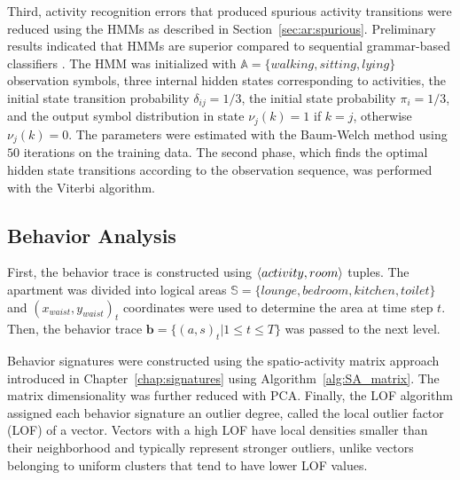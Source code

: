 Third, activity recognition errors that produced spurious activity transitions were reduced using the HMMs \citep{Rabiner1989} as described in Section~\ref{sec:ar:spurious}. Preliminary results indicated that HMMs are superior compared to sequential grammar-based classifiers \citep{Kaluza09Reducing}. The HMM was initialized with $\mathbb{A}=\{walking, sitting, lying\}$ observation symbols, three internal hidden states corresponding to activities, the initial state transition probability $\delta_{ij} = 1/3$, the initial state probability $\pi_i=1/3$, and the output symbol distribution in state $\nu_j(k) = 1$ if $k=j$, otherwise $\nu_j(k)=0$. The parameters were estimated with the Baum-Welch method using $50$ iterations on the training data. The second phase, which finds the optimal hidden state transitions according to the observation sequence, was performed with the Viterbi algorithm. 




\subsection{Behavior Analysis}
\label{sec:ba}

First, the behavior trace is constructed using $\langle activity, room \rangle$ tuples. The apartment was divided into logical areas $\mathbb{S}=\{lounge, bedroom, kitchen, toilet\}$ and $(x_{waist},y_{waist})_t$ coordinates were used to determine the area at time step $t$. Then, the behavior trace $\mathbf{b}=\{(a, s)_t|1\leq t \leq T\}$ was passed to the next level.

Behavior signatures were constructed using the spatio-activity matrix approach introduced in Chapter~\ref{chap:signatures} using Algorithm~\ref{alg:SA_matrix}. The matrix dimensionality was further reduced with PCA. Finally, the LOF algorithm \citep{Breunig00lof} assigned each behavior signature an outlier degree, called the local outlier factor (LOF) of a vector. Vectors with a high LOF have local densities smaller than their neighborhood and typically represent stronger outliers, unlike vectors belonging to uniform clusters that tend to have lower LOF values. 

